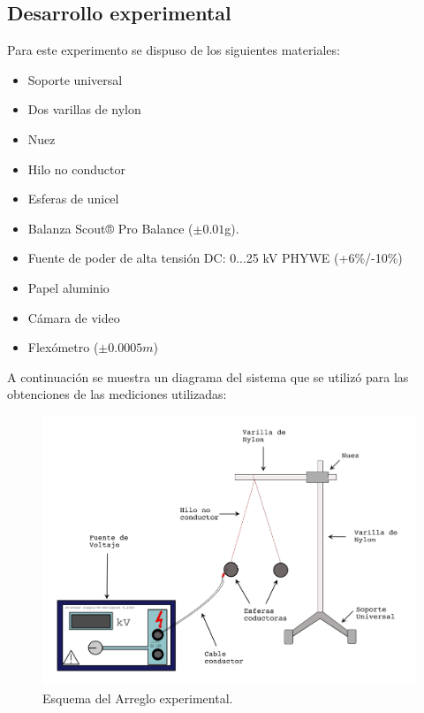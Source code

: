 \documentclass[letterpaper, 11 pt]{article}
\begin{document}
\begin{multicols*}{2}
\section{Desarrollo experimental}
Para este experimento se dispuso de los siguientes materiales:
\begin{itemize}
    \item Soporte universal
    \item Dos varillas de nylon
    \item Nuez
    \item Hilo no conductor
    \item Esferas de unicel
    \item Balanza Scout® Pro Balance ($\pm 0.01$g).
    \item Fuente de poder de alta tensión DC: 0...25 kV PHYWE (+6\%/-10\%)
    \item Papel aluminio
    \item Cámara de video 
\item Flexómetro ($\pm0.0005m$)
\end{itemize}{}

A continuación se muestra un diagrama del sistema que se utilizó para las obtenciones de las mediciones utilizadas:


 \begin{figure}[H]
    \includegraphics[scale=0.19]{turbomamalon.png}
    \centering
    \caption{Esquema del Arreglo experimental.}
\end{figure}




\end{multicols*}
\end{document}
